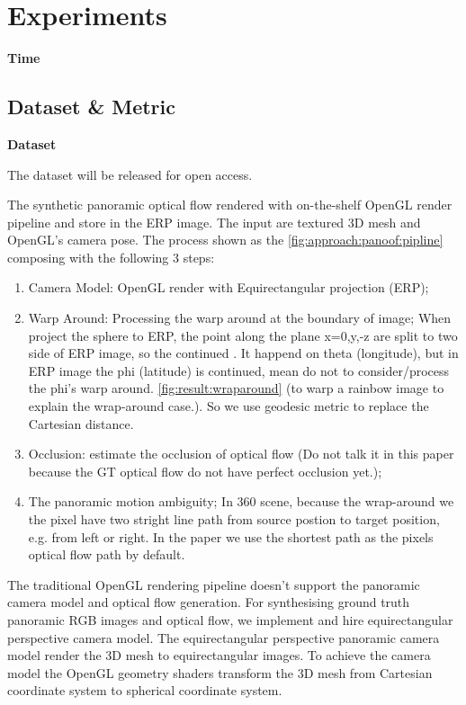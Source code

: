 \section{Experiments}\label{sec:exp}

\textbf{Time} 



\subsection{Dataset \& Metric}


\textbf{Dataset}

The dataset will be released for open access.


The synthetic panoramic optical flow rendered with on-the-shelf OpenGL render pipeline and store in the ERP image.
The input are textured 3D mesh and OpenGL's camera pose.
The process shown as the \cref{fig:approach:panoof:pipline} composing with the following 3 steps:

\begin{enumerate}
	\item Camera Model: OpenGL render with Equirectangular projection (ERP);
	\item Warp Around: Processing the warp around at the boundary of image; When project the sphere to ERP, the point along the plane x=0,y,-z are split to two side of ERP image, so the continued . It happend on theta (longitude), but in ERP image the phi (latitude) is continued, mean do not to consider/process the phi's warp around. \cref{fig:result:wraparound} (to warp a rainbow image to explain the wrap-around case.). So we use geodesic metric to replace the Cartesian distance.
	\item Occlusion: estimate the occlusion of optical flow (Do not talk it in this paper because the GT optical flow do not have perfect occlusion yet.);
	\item The panoramic motion ambiguity; In 360 scene, because the wrap-around we the pixel have two stright line path from source postion to target position, e.g. from left or right. In the paper we use the shortest path as the pixels optical flow path by default.
\end{enumerate}

The traditional OpenGL rendering pipeline doesn't support the panoramic camera model and optical flow generation.
For synthesising ground truth panoramic RGB images and optical flow, we implement and hire equirectangular perspective camera model.
The equirectangular perspective panoramic camera model render the 3D mesh to equirectangular images.
To achieve the camera model the OpenGL geometry shaders transform the 3D mesh from Cartesian coordinate system to spherical coordinate system. 

